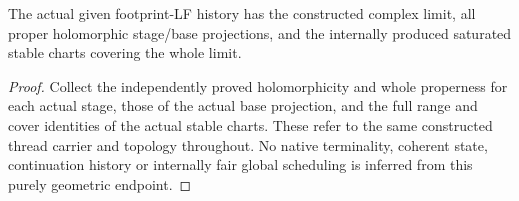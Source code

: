 \begin{theorem}
\label{hir:actual-thread-lf-geometric-endpoint}
\leanok
{}
The actual given footprint-LF history has the constructed complex limit,
all proper holomorphic stage/base projections, and the internally produced
saturated stable charts covering the whole limit.
\end{theorem}
\begin{proof}
Collect the independently proved holomorphicity and whole properness for
each actual stage, those of the actual base projection, and the full range
and cover identities of the actual stable charts. These refer to the same
constructed thread carrier and topology throughout. No native terminality,
coherent state, continuation history or internally fair global scheduling
is inferred from this purely geometric endpoint.
\end{proof}
